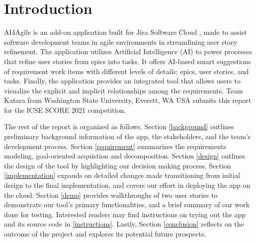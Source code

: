 \section{Introduction}
AI4Agile is an add-on application built for Jira Software Cloud \cite{jira2}, made to assist software development teams in agile environments in streamlining user story refinement. The application utilizes Artificial Intelligence (AI) to power processes that refine user stories from epics into tasks. It offers AI-based smart suggestions of requirement work items with different levels of details: epics, user stories, and tasks. Finally, the application provides an integrated tool that allows users to visualize the explicit and implicit relationships among the requirements. Team Katara from Washington State University, Everett, WA USA submits this report for the ICSE SCORE 2021 competition. 

The rest of the report is organized as follows. Section \ref{background} outlines preliminary background information of the app, the stakeholders, and the team's development process. Section \ref{requirement} summarizes the requirements modeling, goal-oriented acquistion and decomposition. Section \ref{design} outlines the design of the tool by highlighting our decision making process. Section \ref{implementation} expands on detailed changes made transitioning from initial design to the final implementation, and covers our effort in deploying the app on the cloud. Section \ref{demo} provides walkthroughs of two user stories to demonstrate our tool's primary functionalities, and a brief summary of our work done for testing. Interested readers may find instructions on trying out the app and its source code in \ref{instructions}. Lastly, Section \ref{conclusion} reflects on the outcome of the project and explores its potential future prospects. 
